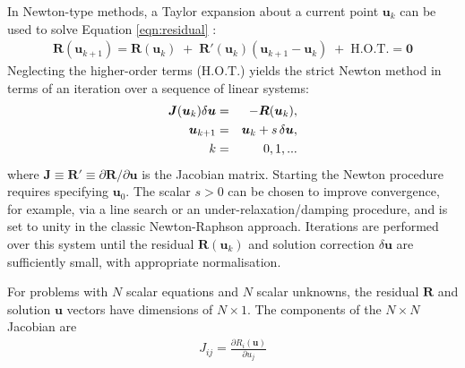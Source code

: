 \documentclass[sn-mathphys,Numbered]{sn-jnl}%
\newcommand{\bb}{\boldsymbol}
\begin{document}
In Newton-type methods, a Taylor expansion about a current point $\bb{u}_k$ can be used to solve Equation \ref{eqn:residual} \cite{Knoll2004}:
\begin{eqnarray}
	\bb{R}(\bb{u}_{k+1}) = \bb{R}(\bb{u}_{k}) \;+\;  \bb{R}'(\bb{u}_{k}) (\bb{u}_{k+1} - \bb{u}_{k}) \;+\; \text{H.O.T.} = \bb{0}
\end{eqnarray}
Neglecting the higher-order terms ($\text{H.O.T.}$) yields the strict Newton method in terms of an iteration over a sequence of linear systems: 
\begin{eqnarray} \label{eq:NewtonRaphson}
	\bb{J}(\bb{u}_k) \delta \bb{u} &=& -\bb{R}(\bb{u}_k), \notag \\
	\bb{u}_{k+1} &=& \bb{u}_k + s \, \delta \bb{u}, \notag \\
	\quad
	k &=& 0,1,...
\end{eqnarray}
where $\bb{J} \equiv \bb{R}' \equiv \partial \bb{R}/\partial \bb{u}$ is the Jacobian matrix.
Starting the Newton procedure requires specifying $\bb{u}_0$.
The scalar $s > 0$ can be chosen to improve convergence, for example, via a line search or an under-relaxation/damping procedure, and is set to unity in the classic Newton-Raphson approach.
Iterations are performed over this system until the residual $\bb{R}(\bb{u}_k)$ and solution correction $\delta \bb{u}$ are sufficiently small, with appropriate normalisation.

For problems with $N$ scalar equations and $N$ scalar unknowns, the residual $\bb{R}$ and solution $\bb{u}$ vectors have dimensions of $N \times 1$. %
The components of the $N \times N$ Jacobian are
\begin{eqnarray} \label{eq:J}
	{J}_{ij} = \frac{\partial {R}_i (\bb{u})}{\partial u_j}
\end{eqnarray}
\end{document}
